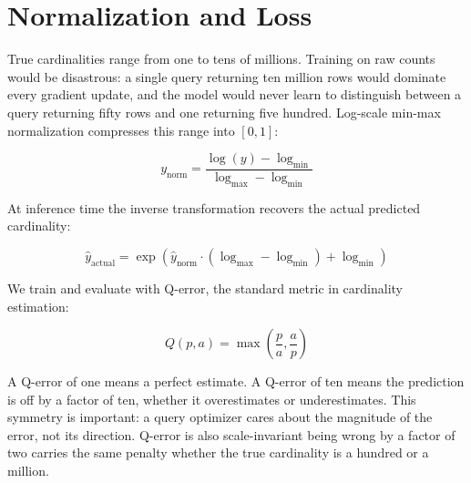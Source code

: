 \section{Normalization and Loss}

True cardinalities range from one to tens of millions. Training on raw counts would be disastrous: a single query returning ten million rows would dominate every gradient update, and the model would never learn to distinguish between a query returning fifty rows and one returning five hundred. Log-scale min-max normalization compresses this range into $[0, 1]$:

\begin{equation}
y_{\text{norm}} = \frac{\log(y) - \log_{\min}}{\log_{\max} - \log_{\min}}
\end{equation}

At inference time the inverse transformation recovers the actual predicted cardinality:

\begin{equation}
\hat{y}_{\text{actual}} = \exp\left(\hat{y}_{\text{norm}} \cdot (\log_{\max} - \log_{\min}) + \log_{\min}\right)
\end{equation}

We train and evaluate with Q-error, the standard metric in cardinality estimation:

\begin{equation}
Q(p, a) = \max\left(\frac{p}{a}, \frac{a}{p}\right)
\end{equation}

A Q-error of one means a perfect estimate. A Q-error of ten means the prediction is off by a factor of ten, whether it overestimates or underestimates. This symmetry is important: a query optimizer cares about the magnitude of the error, not its direction. Q-error is also scale-invariant being wrong by a factor of two carries the same penalty whether the true cardinality is a hundred or a million.
